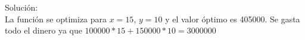 \documentclass[addpoints,spanish, 12pt,a4paper]{exam}
\begin{document}
\begin{questions}
\begin{solution}
    Solución: \\
    La función se optimiza para $x=15$, $y=10$ y el valor óptimo es 405000. Se gasta todo el dinero ya que $100000*15+150000*10 = 3000000$

    

\end{solution}




  
 





\addpoints

\end{questions}
\end{document}
